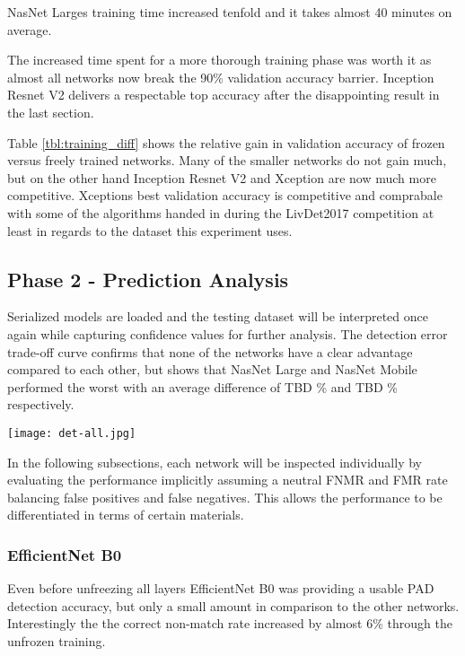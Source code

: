 


NasNet Larges training time increased tenfold and it takes almost 40 minutes on average.





The increased time spent for a more thorough training phase was worth it as almost all networks now break the 90\% validation accuracy barrier.
Inception Resnet V2 delivers a respectable top accuracy after the disappointing result in the last section.





Table \ref{tbl:training_diff} shows the relative gain in validation accuracy of frozen versus freely trained networks.
Many of the smaller networks do not gain much, but on the other hand Inception Resnet V2 and Xception are now much more competitive.
Xceptions best validation accuracy is competitive and comprabale with some of the algorithms handed in during the LivDet2017 competition at least in regards to the dataset this experiment uses. \cite{LIVDET}

\hfill

\subsection{Phase 2 - Prediction Analysis}
Serialized models are loaded and the testing dataset will be interpreted once again while capturing confidence values for further analysis.
The detection error trade-off curve confirms that none of the networks have a clear advantage compared to each other, but shows that NasNet Large and NasNet Mobile performed the worst with an average difference of TBD \% and TBD \% respectively.



\texttt{[image: det-all.jpg]}


In the following subsections, each network will be inspected individually by evaluating the performance implicitly assuming a neutral FNMR and FMR rate balancing false positives and false negatives.
This allows the performance to be differentiated in terms of certain materials.


\newpage
\subsubsection{EfficientNet B0}
Even before unfreezing all layers EfficientNet B0 was providing a usable PAD detection accuracy, but only a small amount in comparison to the other networks.
Interestingly the the correct non-match rate increased by almost 6\% through the unfrozen training.

